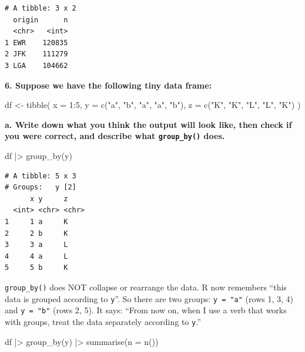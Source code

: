 \documentclass[
  letterpaper,
  DIV=11,
  numbers=noendperiod]{scrreprt}
\newenvironment{Shaded}{\begin{snugshade}}{\end{snugshade}}
\newcommand{\AttributeTok}[1]{\textcolor[rgb]{0.40,0.45,0.13}{#1}}
\newcommand{\DecValTok}[1]{\textcolor[rgb]{0.68,0.00,0.00}{#1}}
\newcommand{\FunctionTok}[1]{\textcolor[rgb]{0.28,0.35,0.67}{#1}}
\newcommand{\NormalTok}[1]{\textcolor[rgb]{0.00,0.23,0.31}{#1}}
\newcommand{\OtherTok}[1]{\textcolor[rgb]{0.00,0.23,0.31}{#1}}
\newcommand{\SpecialCharTok}[1]{\textcolor[rgb]{0.37,0.37,0.37}{#1}}
\newcommand{\StringTok}[1]{\textcolor[rgb]{0.13,0.47,0.30}{#1}}
\begin{document}
\begin{verbatim}
# A tibble: 3 x 2
  origin      n
  <chr>   <int>
1 EWR    120835
2 JFK    111279
3 LGA    104662
\end{verbatim}

\textbf{6. Suppose we have the following tiny data frame:}

\begin{Shaded}
\begin{Highlighting}[]
\NormalTok{df }\OtherTok{\textless{}{-}} \FunctionTok{tibble}\NormalTok{(}
  \AttributeTok{x =} \DecValTok{1}\SpecialCharTok{:}\DecValTok{5}\NormalTok{,}
  \AttributeTok{y =} \FunctionTok{c}\NormalTok{(}\StringTok{"a"}\NormalTok{, }\StringTok{"b"}\NormalTok{, }\StringTok{"a"}\NormalTok{, }\StringTok{"a"}\NormalTok{, }\StringTok{"b"}\NormalTok{),}
  \AttributeTok{z =} \FunctionTok{c}\NormalTok{(}\StringTok{"K"}\NormalTok{, }\StringTok{"K"}\NormalTok{, }\StringTok{"L"}\NormalTok{, }\StringTok{"L"}\NormalTok{, }\StringTok{"K"}\NormalTok{)}
\NormalTok{)}
\end{Highlighting}
\end{Shaded}

\textbf{a. Write down what you think the output will look like, then
check if you were correct, and describe what \texttt{group\_by()} does.}

\begin{Shaded}
\begin{Highlighting}[]
\NormalTok{df }\SpecialCharTok{|\textgreater{}}
  \FunctionTok{group\_by}\NormalTok{(y)}
\end{Highlighting}
\end{Shaded}

\begin{verbatim}
# A tibble: 5 x 3
# Groups:   y [2]
      x y     z    
  <int> <chr> <chr>
1     1 a     K    
2     2 b     K    
3     3 a     L    
4     4 a     L    
5     5 b     K    
\end{verbatim}

\texttt{group\_by()} does NOT collapse or rearrange the data. R now
remembers ``this data is grouped according to \texttt{y}''. So there are
two groups: \texttt{y\ =\ "a"} (rows 1, 3, 4) and \texttt{y\ =\ "b"}
(rows 2, 5). It says: ``From now on, when I use a verb that works with
groups, treat the data separately according to \texttt{y}.''

\begin{Shaded}
\begin{Highlighting}[]
\NormalTok{df }\SpecialCharTok{|\textgreater{}}
  \FunctionTok{group\_by}\NormalTok{(y) }\SpecialCharTok{|\textgreater{}}
  \FunctionTok{summarise}\NormalTok{(}\AttributeTok{n =} \FunctionTok{n}\NormalTok{())}
\end{Highlighting}
\end{Shaded}
\end{document}
